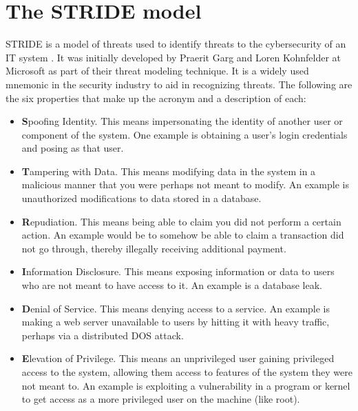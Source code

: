 \section{The STRIDE model} \label{ch:method:stride}
STRIDE is a model of threats used to identify threats to the cybersecurity of an IT system \cite{stride}. It was initially developed by Praerit Garg and Loren Kohnfelder at Microsoft as part of their threat modeling technique. It is a widely used mnemonic in the security industry to aid in recognizing threats. The following are the six properties that make up the acronym and a description of each:
\begin{itemize}
    \item \textbf{S}poofing Identity. This means impersonating the identity of another user or component of the system. One example is obtaining a user's login credentials and posing as that user.
    \item \textbf{T}ampering with Data. This means modifying data in the system in a malicious manner that you were perhaps not meant to modify. An example is unauthorized modifications to data stored in a database.
    \item \textbf{R}epudiation. This means being able to claim you did not perform a certain action. An example would be to somehow be able to claim a transaction did not go through, thereby illegally receiving additional payment.
    \item \textbf{I}nformation Disclosure. This means exposing information or data to users who are not meant to have access to it. An example is a database leak.
    \item \textbf{D}enial of Service. This means denying access to a service. An example is making a web server unavailable to users by hitting it with heavy traffic, perhaps via a distributed \gls{DOS} attack.
    \item \textbf{E}levation of Privilege. This means an unprivileged user gaining privileged access to the system, allowing them access to features of the system they were not meant to. An example is exploiting a vulnerability in a program or kernel to get access as a more privileged user on the machine (like root).
\end{itemize}
